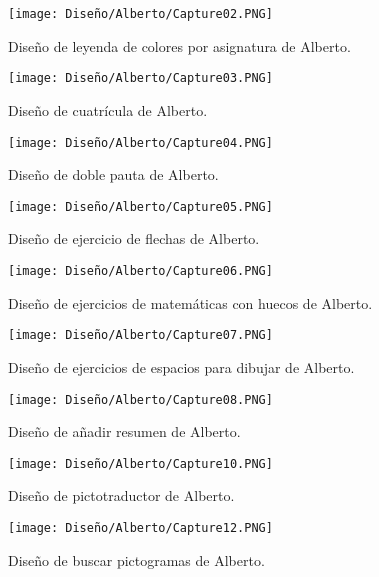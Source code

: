 \begin{figure}[ht!]
  \centering
\texttt{[image: Diseño/Alberto/Capture02.PNG]}
  \caption{Diseño de leyenda de colores por asignatura de Alberto.}
  
  
\end{figure}
\begin{figure}[ht!]
  \centering
\texttt{[image: Diseño/Alberto/Capture03.PNG]}
  \caption{Diseño de cuatrícula de Alberto.}
  
  
\end{figure}
\begin{figure}[ht!]
  \centering
\texttt{[image: Diseño/Alberto/Capture04.PNG]}
  \caption{Diseño de doble pauta de Alberto.}
  
  
\end{figure}
\begin{figure}[ht!]
  \centering
\texttt{[image: Diseño/Alberto/Capture05.PNG]}
  \caption{Diseño de ejercicio de flechas de Alberto.}
  
  
\end{figure}
\begin{figure}[ht!]
  \centering
\texttt{[image: Diseño/Alberto/Capture06.PNG]}
  \caption{Diseño de ejercicios de matemáticas con huecos de Alberto.}
  
  
\end{figure}
\begin{figure}[ht!]
  \centering
\texttt{[image: Diseño/Alberto/Capture07.PNG]}
  \caption{Diseño de ejercicios de espacios para dibujar de Alberto.}
  
 
\end{figure}
\begin{figure}[ht!]
  \centering
\texttt{[image: Diseño/Alberto/Capture08.PNG]}
  \caption{Diseño de añadir resumen de Alberto.}
  
  
  
  
\end{figure}
\begin{figure}[ht!]
  \centering
\texttt{[image: Diseño/Alberto/Capture10.PNG]}
  \caption{Diseño de pictotraductor de Alberto.}
  
  
  
\end{figure}
\begin{figure}[ht!]
  \centering
\texttt{[image: Diseño/Alberto/Capture12.PNG]}
  \caption{Diseño de buscar pictogramas de Alberto.}
  
  
\end{figure}
